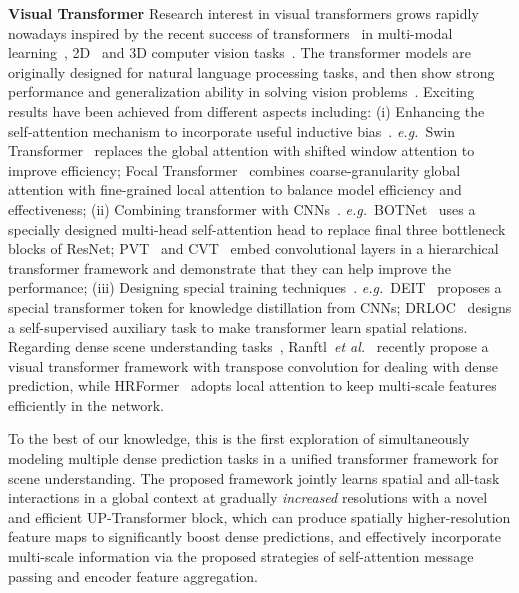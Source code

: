 \documentclass[runningheads]{llncs}
\newcommand*{\eg}{\emph{e.g.}}
\begin{document}
\par\noindent\textbf{Visual Transformer}
Research interest in visual transformers grows rapidly nowadays inspired by the recent success of transformers~\cite{transformer} in multi-modal learning~\cite{clip,dalle}, 2D~\cite{parmar2018image,vit,detr,ipt,han2021transformer,chen2021pix2seq} and 3D computer vision tasks~\cite{pan20213d,mao2021voxel,Zhao_2021_ICCV}.
The transformer models are originally designed for natural language processing tasks, and then show strong performance and generalization ability in solving vision problems~\cite{vit,bhojanapalli2021understanding,bai2021transformers}. Exciting results have been achieved from different aspects including:
(i) Enhancing the self-attention mechanism to incorporate useful inductive bias~\cite{convit,ramachandran2019stand,swin,focal}. \eg~Swin Transformer~\cite{swin} replaces the global attention with shifted window attention to improve efficiency; Focal Transformer~\cite{focal} combines coarse-granularity global attention with fine-grained local attention to balance model efficiency and effectiveness;
(ii) Combining transformer with CNNs~\cite{srinivas2021bottleneck,pvt,cvt}. \eg~BOTNet~\cite{srinivas2021bottleneck} uses a specially designed multi-head self-attention head to replace final three bottleneck blocks of ResNet; PVT~\cite{pvt} and CVT~\cite{cvt} embed convolutional layers in a hierarchical transformer framework and demonstrate that they can help improve the performance;
(iii) Designing special training techniques~\cite{deit,liu2021efficient,touvron2021going}. \eg~DEIT~\cite{deit} proposes a special transformer token for knowledge distillation from CNNs; DRLOC~\cite{liu2021efficient} designs a self-supervised auxiliary task to make transformer learn spatial relations. Regarding dense scene understanding tasks~\cite{pvt,xie2021segformer}, Ranftl~\textit{et al.}~\cite{dpt} recently propose a visual transformer framework with transpose convolution for dealing with dense prediction, while HRFormer~\cite{hrformer} adopts local attention to keep multi-scale features efficiently in the network.
\par To the best of our knowledge, this is the first exploration of simultaneously modeling multiple dense prediction tasks in a unified transformer framework for scene understanding. The proposed framework jointly learns spatial and all-task interactions in a global context at gradually \emph{increased} resolutions with a novel and efficient UP-Transformer block, which can produce spatially higher-resolution feature maps to significantly boost dense predictions, and effectively incorporate multi-scale information via the proposed strategies of self-attention message passing and encoder feature aggregation.
\end{document}
